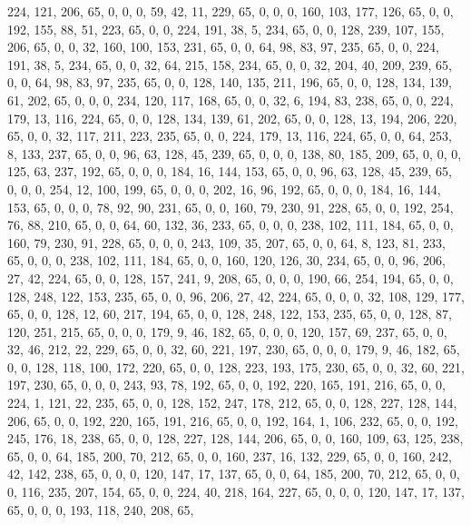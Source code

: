 \begin{DoxyCode}
       224, 121, 206, 65, 0, 0, 0, 59, 42, 11, 229, 65, 0, 0, 0, 160, 103, 177, 126, 65, 0, 0, 192, 155, 88, 51,
       223, 65, 0, 0, 224, 191, 38, 5, 234, 65, 0, 0, 128, 239, 107, 155, 206, 65, 0, 0, 32, 160, 100, 153, 231, 65,
       0, 0, 64, 98, 83, 97, 235, 65, 0, 0, 224, 191, 38, 5, 234, 65, 0, 0, 32, 64, 215, 158, 234, 65, 0, 0, 32,
       204, 40, 209, 239, 65, 0, 0, 64, 98, 83, 97, 235, 65, 0, 0, 128, 140, 135, 211, 196, 65, 0, 0, 128, 134, 139,
       61, 202, 65, 0, 0, 0, 234, 120, 117, 168, 65, 0, 0, 32, 6, 194, 83, 238, 65, 0, 0, 224, 179, 13, 116, 224,
       65, 0, 0, 128, 134, 139, 61, 202, 65, 0, 0, 128, 13, 194, 206, 220, 65, 0, 0, 32, 117, 211, 223, 235, 65, 0,
       0, 224, 179, 13, 116, 224, 65, 0, 0, 64, 253, 8, 133, 237, 65, 0, 0, 96, 63, 128, 45, 239, 65, 0, 0, 0, 138,
       80, 185, 209, 65, 0, 0, 0, 125, 63, 237, 192, 65, 0, 0, 0, 184, 16, 144, 153, 65, 0, 0, 96, 63, 128, 45,
       239, 65, 0, 0, 0, 254, 12, 100, 199, 65, 0, 0, 0, 202, 16, 96, 192, 65, 0, 0, 0, 184, 16, 144, 153, 65, 0, 0,
       0, 78, 92, 90, 231, 65, 0, 0, 160, 79, 230, 91, 228, 65, 0, 0, 192, 254, 76, 88, 210, 65, 0, 0, 64, 60, 132,
       36, 233, 65, 0, 0, 0, 238, 102, 111, 184, 65, 0, 0, 160, 79, 230, 91, 228, 65, 0, 0, 0, 243, 109, 35, 207,
       65, 0, 0, 64, 8, 123, 81, 233, 65, 0, 0, 0, 238, 102, 111, 184, 65, 0, 0, 160, 120, 126, 30, 234, 65, 0, 0,
       96, 206, 27, 42, 224, 65, 0, 0, 128, 157, 241, 9, 208, 65, 0, 0, 0, 190, 66, 254, 194, 65, 0, 0, 128, 248,
       122, 153, 235, 65, 0, 0, 96, 206, 27, 42, 224, 65, 0, 0, 0, 32, 108, 129, 177, 65, 0, 0, 128, 12, 60, 217,
       194, 65, 0, 0, 128, 248, 122, 153, 235, 65, 0, 0, 128, 87, 120, 251, 215, 65, 0, 0, 0, 179, 9, 46, 182, 65, 0,
       0, 0, 120, 157, 69, 237, 65, 0, 0, 32, 46, 212, 22, 229, 65, 0, 0, 32, 60, 221, 197, 230, 65, 0, 0, 0, 179,
       9, 46, 182, 65, 0, 0, 128, 118, 100, 172, 220, 65, 0, 0, 128, 223, 193, 175, 230, 65, 0, 0, 32, 60, 221,
       197, 230, 65, 0, 0, 0, 243, 93, 78, 192, 65, 0, 0, 192, 220, 165, 191, 216, 65, 0, 0, 224, 1, 121, 22, 235,
       65, 0, 0, 128, 152, 247, 178, 212, 65, 0, 0, 128, 227, 128, 144, 206, 65, 0, 0, 192, 220, 165, 191, 216, 65,
       0, 0, 192, 164, 1, 106, 232, 65, 0, 0, 192, 245, 176, 18, 238, 65, 0, 0, 128, 227, 128, 144, 206, 65, 0, 0,
       160, 109, 63, 125, 238, 65, 0, 0, 64, 185, 200, 70, 212, 65, 0, 0, 160, 237, 16, 132, 229, 65, 0, 0, 160,
       242, 42, 142, 238, 65, 0, 0, 0, 120, 147, 17, 137, 65, 0, 0, 64, 185, 200, 70, 212, 65, 0, 0, 0, 116, 235, 207,
       154, 65, 0, 0, 224, 40, 218, 164, 227, 65, 0, 0, 0, 120, 147, 17, 137, 65, 0, 0, 0, 193, 118, 240, 208, 65,

\end{DoxyCode}
